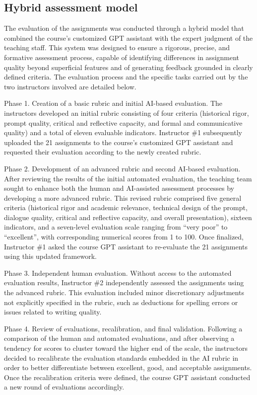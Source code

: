 \documentclass[english]{textolivre}
\begin{document}
\subsection{Hybrid assessment model}\label{sec-2.3}
The evaluation of the assignments was conducted through a hybrid model that combined the course's customized GPT assistant with the expert judgment of the teaching staff. This system was designed to ensure a rigorous, precise, and formative assessment process, capable of identifying differences in assignment quality beyond superficial features and of generating feedback grounded in clearly defined criteria. The evaluation process and the specific tasks carried out by the two instructors involved are detailed below.

Phase 1. Creation of a basic rubric and initial AI-based evaluation. The instructors developed an initial rubric consisting of four criteria (historical rigor, prompt quality, critical and reflective capacity, and formal and communicative quality) and a total of eleven evaluable indicators. Instructor \#1 subsequently uploaded the 21 assignments to the course’s customized GPT assistant and requested their evaluation according to the newly created rubric.

 Phase 2. Development of an advanced rubric and second AI-based evaluation. After reviewing the results of the initial automated evaluation, the teaching team sought to enhance both the human and AI-assisted assessment processes by developing a more advanced rubric. This revised rubric comprised five general criteria (historical rigor and academic relevance, technical design of the prompt, dialogue quality, critical and reflective capacity, and overall presentation), sixteen indicators, and a seven-level evaluation scale ranging from ``very poor'' to ``excellent'', with corresponding numerical scores from 1 to 100. Once finalized, Instructor \#1 asked the course GPT assistant to re-evaluate the 21 assignments using this updated framework.

Phase 3. Independent human evaluation. Without access to the automated evaluation results, Instructor \#2 independently assessed the assignments using the advanced rubric. This evaluation included minor discretionary adjustments not explicitly specified in the rubric, such as deductions for spelling errors or issues related to writing quality.

Phase 4. Review of evaluations, recalibration, and final validation. Following a comparison of the human and automated evaluations, and after observing a tendency for scores to cluster toward the higher end of the scale, the instructors decided to recalibrate the evaluation standards embedded in the AI rubric in order to better differentiate between excellent, good, and acceptable assignments. Once the recalibration criteria were defined, the course GPT assistant conducted a new round of evaluations accordingly.
\end{document}
